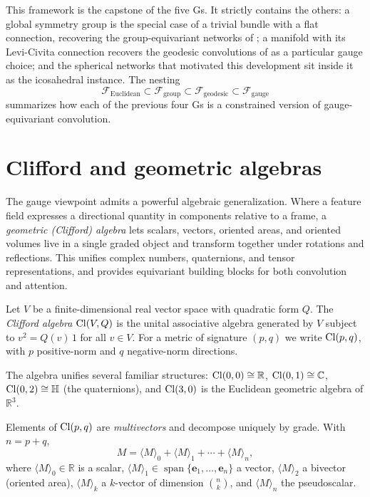 This framework is the capstone of the five Gs. It strictly contains the others:
a global symmetry group is the special case of a trivial bundle with a flat
connection, recovering the group-equivariant networks of ; a
manifold with its Levi-Civita connection recovers the geodesic convolutions of
 as a particular gauge choice; and the spherical networks
that motivated this development sit inside it as the icosahedral instance. The
nesting
\[
  \mathcal{F}_{\text{Euclidean}} \subset \mathcal{F}_{\text{group}}
  \subset \mathcal{F}_{\text{geodesic}} \subset \mathcal{F}_{\text{gauge}}
\]
summarizes how each of the previous four Gs is a constrained version of
gauge-equivariant convolution.

\section{Clifford and geometric algebras}
\label{sec:gauge:clifford}

The gauge viewpoint admits a powerful algebraic generalization. Where a feature
field expresses a directional quantity in components relative to a frame, a
\emph{geometric (Clifford) algebra} lets scalars, vectors, oriented areas, and
oriented volumes live in a single graded object and transform together under
rotations and reflections. This unifies complex numbers, quaternions, and tensor
representations, and provides equivariant building blocks for both convolution
and attention.

\begin{definition}
\label{def:gauge:clifford}
Let $V$ be a finite-dimensional real vector space with quadratic form $Q$. The
\emph{Clifford algebra} $\operatorname{Cl}(V, Q)$ is the unital associative algebra generated
by $V$ subject to $v^2 = Q(v)\, 1$ for all $v \in V$. For a metric of signature
$(p, q)$ we write $\operatorname{Cl}(p, q)$, with $p$ positive-norm and $q$ negative-norm
directions.
\end{definition}

The algebra unifies several familiar structures: $\operatorname{Cl}(0,0) \cong \mathbb{R}$,
$\operatorname{Cl}(0,1) \cong \mathbb{C}$, $\operatorname{Cl}(0,2) \cong \mathbb{H}$ (the quaternions), and
$\operatorname{Cl}(3,0)$ is the Euclidean geometric algebra of $\mathbb{R}^3$.

\begin{definition}
\label{def:gauge:multivector}
Elements of $\operatorname{Cl}(p, q)$ are \emph{multivectors} and decompose uniquely by grade.
With $n = p + q$,
\[
  M = \langle M \rangle_0 + \langle M \rangle_1 + \cdots + \langle M \rangle_n,
\]
where $\langle M \rangle_0 \in \mathbb{R}$ is a scalar, $\langle M \rangle_1 \in
\operatorname{span}\{\mathbf{e}_1, \ldots, \mathbf{e}_n\}$ a vector,
$\langle M \rangle_2$ a bivector (oriented area), $\langle M \rangle_k$ a
$k$-vector of dimension $\binom{n}{k}$, and $\langle M \rangle_n$ the
pseudoscalar.
\end{definition}

